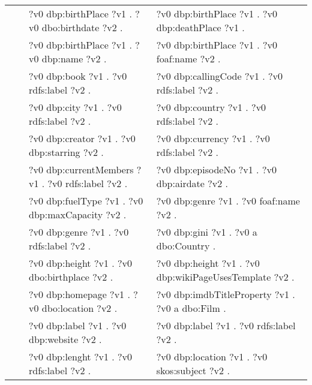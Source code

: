 \begin{table}
{\begin{tabular}{!{\color{white}\vrule}l!{\color{white}\vrule}c@{\hs}!{\color{white}\vrule}p{11.5cm}!{\color{white}\vrule}p{11.5cm}!{\color{white}\vrule}}
			 &  \phantom{a} &     ?v0 dbp:birthPlace ?v1 .  ?v0 dbo:birthdate ?v2 . &  ?v0 dbp:birthPlace ?v1 .  ?v0 dbp:deathPlace ?v1 . \\
			 &  \phantom{a} &     ?v0 dbp:birthPlace ?v1 .  ?v0 dbp:name ?v2 . &  ?v0 dbp:birthPlace ?v1 .  ?v0 foaf:name ?v2 . \\
			 &  \phantom{a} &     ?v0 dbp:book ?v1 .  ?v0 rdfs:label ?v2 . &  ?v0 dbp:callingCode ?v1 .  ?v0 rdfs:label ?v2 . \\
			 &  \phantom{a} &     ?v0 dbp:city ?v1 .  ?v0 rdfs:label ?v2 . &  ?v0 dbp:country ?v1 .  ?v0 rdfs:label ?v2 . \\
			 &  \phantom{a} &     ?v0 dbp:creator ?v1 .  ?v0 dbp:starring ?v2 . &  ?v0 dbp:currency ?v1 .  ?v0 rdfs:label ?v2 . \\
			 &  \phantom{a} &     ?v0 dbp:currentMembers ?v1 .  ?v0 rdfs:label ?v2 . &  ?v0 dbp:episodeNo ?v1 .  ?v0 dbp:airdate ?v2 . \\
			 &  \phantom{a} &     ?v0 dbp:fuelType ?v1 .  ?v0 dbp:maxCapacity ?v2 . &  ?v0 dbp:genre ?v1 .  ?v0 foaf:name ?v2 . \\
			 &  \phantom{a} &     ?v0 dbp:genre ?v1 .  ?v0 rdfs:label ?v2 . &  ?v0 dbp:gini ?v1 .  ?v0 a dbo:Country . \\
			 &  \phantom{a} &     ?v0 dbp:height ?v1 .  ?v0 dbo:birthplace ?v2 . &  ?v0 dbp:height ?v1 .  ?v0 dbp:wikiPageUsesTemplate ?v2 . \\
			 &  \phantom{a} &     ?v0 dbp:homepage ?v1 .  ?v0 dbo:location ?v2 . &  ?v0 dbp:imdbTitleProperty ?v1 .  ?v0 a dbo:Film . \\
			 &  \phantom{a} &     ?v0 dbp:label ?v1 .  ?v0 dbp:website ?v2 . &  ?v0 dbp:label ?v1 .  ?v0 rdfs:label ?v2 . \\
			 &  \phantom{a} &     ?v0 dbp:lenght ?v1 .  ?v0 rdfs:label ?v2 . &  ?v0 dbp:location ?v1 .  ?v0 skos:subject ?v2 . \\

\end{tabular}}
\end{table}
